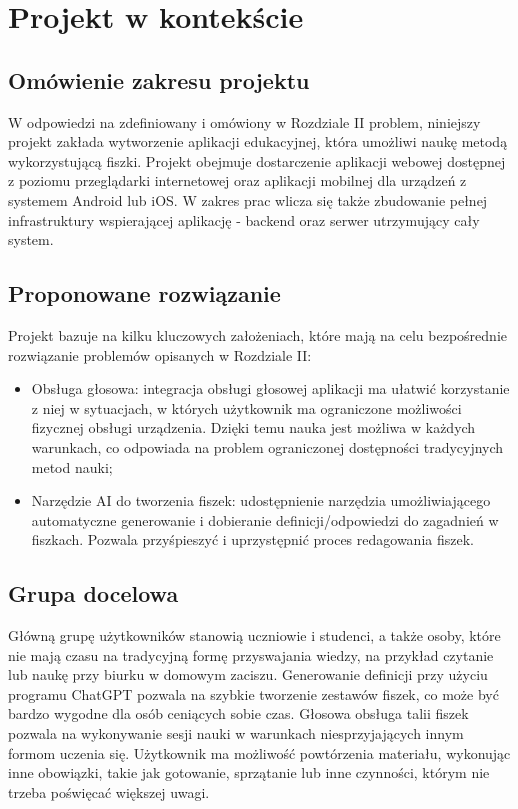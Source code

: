 \chapter{Projekt w kontekście}

\section{Omówienie zakresu projektu}

W odpowiedzi na zdefiniowany i omówiony w Rozdziale II problem, niniejszy projekt zakłada wytworzenie aplikacji edukacyjnej, która umożliwi naukę metodą wykorzystującą fiszki. Projekt obejmuje dostarczenie aplikacji webowej dostępnej z poziomu przeglądarki internetowej oraz aplikacji mobilnej dla urządzeń z systemem Android lub iOS. W zakres prac wlicza się także zbudowanie pełnej infrastruktury wspierającej aplikację - backend oraz serwer utrzymujący cały system.

\section{Proponowane rozwiązanie}

Projekt bazuje na kilku kluczowych założeniach, które mają na celu bezpośrednie rozwiązanie problemów opisanych w Rozdziale II:

\begin{itemize}
    \item Obsługa głosowa: integracja obsługi głosowej aplikacji ma ułatwić korzystanie z niej w sytuacjach, w których użytkownik ma ograniczone możliwości fizycznej obsługi urządzenia. Dzięki temu nauka jest możliwa w każdych warunkach, co odpowiada na problem ograniczonej dostępności tradycyjnych metod nauki;
    \item Narzędzie AI do tworzenia fiszek: udostępnienie narzędzia umożliwiającego automatyczne generowanie i dobieranie definicji/odpowiedzi do zagadnień w fiszkach. Pozwala przyśpieszyć i uprzystępnić proces redagowania fiszek.
\end{itemize}

\section{Grupa docelowa}

Główną grupę użytkowników stanowią uczniowie i studenci, a także osoby, które nie mają czasu na tradycyjną formę przyswajania wiedzy, na przykład czytanie lub naukę przy biurku w domowym zaciszu. Generowanie definicji przy użyciu programu ChatGPT pozwala na szybkie tworzenie zestawów fiszek, co może być bardzo wygodne dla osób ceniących sobie czas. Głosowa obsługa talii fiszek pozwala na wykonywanie sesji nauki w warunkach niesprzyjających innym formom uczenia się. Użytkownik ma możliwość powtórzenia materiału, wykonując inne obowiązki, takie jak gotowanie, sprzątanie lub inne czynności, którym nie trzeba poświęcać większej uwagi.

